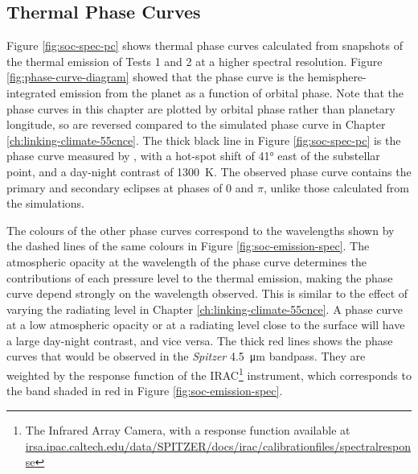 \subsection{Thermal Phase Curves}

Figure \ref{fig:soc-spec-pc} shows thermal phase curves calculated from snapshots of the thermal emission of Tests 1 and 2 at a higher spectral resolution. Figure \ref{fig:phase-curve-diagram} showed that the phase curve is the hemisphere-integrated emission from the planet as a function of orbital phase. Note that the phase curves in this chapter are plotted by orbital phase rather than planetary longitude, so are reversed compared to the simulated phase curve in Chapter \ref{ch:linking-climate-55cnce}. The thick black line in Figure \ref{fig:soc-spec-pc} is the phase curve measured by \citet{demory201655cnce}, with a hot-spot shift of \ang{41} east of the substellar point, and a day-night contrast of \SI{1300}{\kelvin}. The observed phase curve contains the primary and secondary eclipses at phases of 0 and $\pi$, unlike those calculated from the simulations.

The colours of the other phase curves correspond to the wavelengths shown by the dashed lines of the same colours in Figure \ref{fig:soc-emission-spec}. The atmospheric opacity at the wavelength of the phase curve determines the contributions of each pressure level to the thermal emission, making the phase curve depend strongly on the wavelength observed. This is similar to the effect of varying the radiating level in Chapter \ref{ch:linking-climate-55cnce}. A phase curve at a low atmospheric opacity or at a radiating level close to the surface will have a large day-night contrast, and vice versa. The thick red lines shows the phase curves that would be observed in the \textit{Spitzer} \SI{4.5}{\micro\metre} bandpass. They are weighted by the response function of the IRAC\footnote{The Infrared Array Camera, with a response function available at \url{irsa.ipac.caltech.edu/data/SPITZER/docs/irac/calibrationfiles/spectralresponse}} instrument, which corresponds to the band shaded in red in Figure \ref{fig:soc-emission-spec}.


